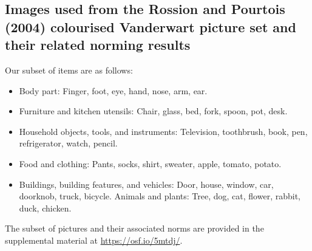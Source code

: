 \clearpage



\begin{appendix}
\section{}
\subsection{Images used from the Rossion and Pourtois (2004) colourised
Vanderwart picture set and their related norming
results}\label{appendix-d}

Our subset of items are as follows:

\begin{itemize}
\item
  Body part: Finger, foot, eye, hand, nose, arm, ear.
\item
  Furniture and kitchen utensils: Chair, glass, bed, fork, spoon, pot,
  desk.
\item
  Household objects, tools, and instruments: Television, toothbrush,
  book, pen, refrigerator, watch, pencil.
\item
  Food and clothing: Pants, socks, shirt, sweater, apple, tomato,
  potato.
\item
  Buildings, building features, and vehicles: Door, house, window, car,
  doorknob, truck, bicycle. Animals and plants: Tree, dog, cat, flower,
  rabbit, duck, chicken.
\end{itemize}

The subset of pictures and their associated norms are provided in the
supplemental material at \url{https://osf.io/5mtdj/}.
\end{appendix}

